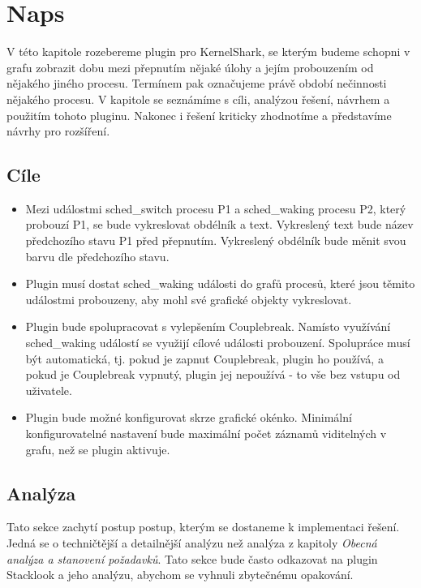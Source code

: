 \chapter{Naps}
\label{nappin}
V této kapitole rozebereme plugin pro KernelShark, se kterým budeme schopni v grafu zobrazit dobu mezi přepnutím nějaké úlohy a jejím probouzením od nějakého jiného procesu. Termínem  pak označujeme právě období nečinnosti nějakého procesu. V kapitole se seznámíme s cíli, analýzou řešení, návrhem a použitím tohoto pluginu. Nakonec i řešení kriticky zhodnotíme a představíme návrhy pro rozšíření.

\section{Cíle}

\begin{itemize}
    \item Mezi událostmi sched\_switch procesu P1 a sched\_waking procesu P2, který probouzí P1, se bude vykreslovat obdélník a text. Vykreslený text bude název předchozího stavu P1 před přepnutím. Vykreslený obdélník bude měnit svou barvu dle předchozího stavu.
    \item Plugin musí dostat sched\_waking události do grafů procesů, které jsou těmito událostmi probouzeny, aby mohl své grafické objekty vykreslovat.
    \item Plugin bude spolupracovat s vylepšením Couplebreak. Namísto využívání sched\_waking událostí se využijí cílové události probouzení. Spolupráce musí být automatická, tj. pokud je zapnut Couplebreak, plugin ho používá, a pokud je Couplebreak vypnutý, plugin jej nepoužívá - to vše bez vstupu od uživatele.
    \item Plugin bude možné konfigurovat skrze grafické okénko. Minimální konfigurovatelné nastavení bude maximální počet záznamů viditelných v grafu, než se plugin aktivuje. 
\end{itemize}

\section{Analýza}
Tato sekce zachytí postup postup, kterým se dostaneme k implementaci řešení. Jedná se o techničtější a detailnější analýzu než analýza z kapitoly \emph{Obecná analýza a stanovení požadavků}. Tato sekce bude často odkazovat na plugin Stacklook a jeho analýzu, abychom se vyhnuli zbytečnému opakování.


